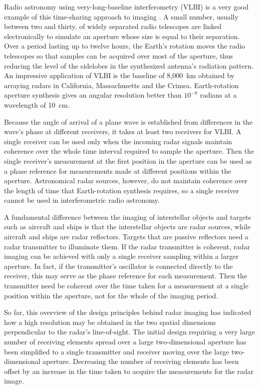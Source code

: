 Radio astronomy using very-long-baseline interferometry (VLBI) is a very
good example of this time-sharing approach to imaging \cite{Coh73}.  A small
number, usually between two and thirty, of widely separated radio telescopes
are linked electronically to simulate an aperture whose size is equal to
their separation.  Over a period lasting up to twelve hours, the Earth's
rotation moves the radio telescopes so that samples can be acquired over
most of the aperture, thus reducing the level of the sidelobes in the
synthesized antenna's radiation pattern.  An impressive application of VLBI
is the baseline of 8,000~km obtained by arraying radars in California,
Massachusetts and the Crimea.  Earth-rotation aperture synthesis \cite{Fom73}
gives an angular resolution better than $10^{-8}$ radians at a wavelength 
of 10~cm.

Because the angle of arrival of a plane wave is established from differences
in the wave's phase at different receivers, it takes at least two receivers
for VLBI.  A single receiver can be used only when the incoming radar
signals maintain coherence over the whole time interval required to sample
the aperture. Then the single receiver's measurement at the first position
in the aperture can be used as a phase reference for measurements made at
different positions within the aperture.  Astronomical radar sources,
however, do not maintain coherence over the length of time that
Earth-rotation synthesis requires, so a single receiver cannot be used in 
interferometric radio astronomy.

A fundamental difference between the imaging of interstellar objects and
targets such as aircraft and ships is that the interstellar objects are
radar sources, while aircraft and ships are radar reflectors.  Targets that
are passive reflectors need a radar transmitter to illuminate them.  If the
radar transmitter is coherent, radar imaging can be achieved with only a
single receiver sampling within a larger aperture.  In fact, if the
transmitter's oscillator is connected directly to the receiver, this may
serve as the phase reference for each measurement.  Then the transmitter
need be coherent over the time taken for a measurement at a single position
within the aperture, not for the whole of the imaging period.  

So far, this overview of the design principles behind radar imaging has
indicated how a high resolution may be obtained in the two spatial
dimensions perpendicular to the radar's line-of-sight.  The initial design
requiring a very large number of receiving elements spread over a large
two-dimensional aperture has been simplified to a single transmitter and
receiver moving over the large two-dimensional aperture.  Decreasing the
number of receiving elements has been offset by an increase in the time
taken to acquire the measurements for the radar image.  

